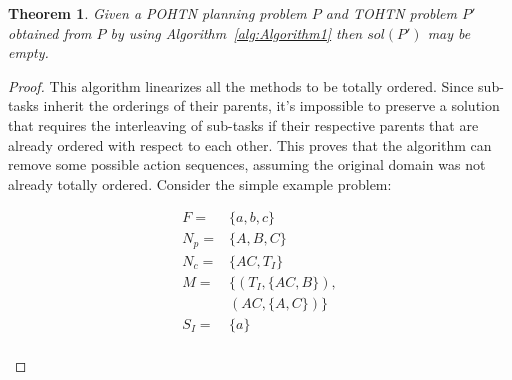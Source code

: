 \documentclass[letterpaper]{article}
\newtheorem{theorem}{Theorem}
\newtheorem{proof}{Proof}
\begin{document}
\begin{theorem}\label{thm:notCompleteness}
	Given a POHTN planning problem $P$ and TOHTN problem
	$P'$ obtained from $P$ by using Algorithm~\ref{alg:Algorithm1}
	then $sol(P')$ may be empty.
\end{theorem}
\begin{proof}
	This algorithm linearizes all the methods to be totally ordered. Since sub-tasks inherit the orderings of their parents, it's impossible to preserve a solution that requires the interleaving of sub-tasks if their respective parents that are already ordered with respect to each other. This proves that the algorithm can remove some possible action sequences, assuming the original domain was not already totally ordered. Consider the simple example problem:
	
	
	\begin{figure}
		\caption{Diagram showing an example problem and its decomposition.}		
		\begin{subfigure}{3.5cm}
			\begin{align*}
			F   = & \{a, b, c \}           \\
			N_p = & \{A, B, C\}      \\
			N_c = & \{AC, T_I\}            \\ 
			M   = & \{  (T_I, \{AC, B\}), \\
			&    (AC, \{A, C\})  \} \\
			S_I = & \{ a \} 	             \\ 
			\end{align*} 
		\end{subfigure}		
\end{figure}
\end{proof}
\end{document}
